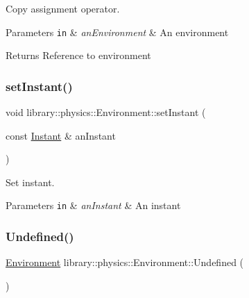Copy assignment operator. 


\begin{DoxyParams}[1]{Parameters}
\mbox{\tt in}  & {\em an\+Environment} & An environment \\
\hline
\end{DoxyParams}
\begin{DoxyReturn}{Returns}
Reference to environment 
\end{DoxyReturn}
\mbox{\label{classlibrary_1_1physics_1_1_environment_a6279d44965a3894993cee2bc0c51d068}} 
\subsubsection{\texorpdfstring{set\+Instant()}{setInstant()}}
{\footnotesize\ttfamily void library\+::physics\+::\+Environment\+::set\+Instant (\begin{DoxyParamCaption}\item[{const \hyperlink{classlibrary_1_1physics_1_1time_1_1_instant}{Instant} \&}]{an\+Instant }\end{DoxyParamCaption})}



Set instant. 


\begin{DoxyParams}[1]{Parameters}
\mbox{\tt in}  & {\em an\+Instant} & An instant \\
\hline
\end{DoxyParams}
\mbox{\label{classlibrary_1_1physics_1_1_environment_a8d1dfff3867d59ecdebd3ee6e98a2dab}} 
\subsubsection{\texorpdfstring{Undefined()}{Undefined()}}
{\footnotesize\ttfamily \hyperlink{classlibrary_1_1physics_1_1_environment}{Environment} library\+::physics\+::\+Environment\+::\+Undefined (\begin{DoxyParamCaption}{ }\end{DoxyParamCaption})\hspace{0.3cm}{\ttfamily [static]}}



